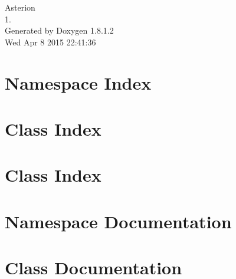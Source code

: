 \documentclass{book}
\begin{document}
\hypersetup{pageanchor=false,citecolor=blue}
\begin{titlepage}
\vspace*{7cm}
\begin{center}
{\Large Asterion \\[1ex]\large 1. }\\
\vspace*{1cm}
{\large Generated by Doxygen 1.8.1.2}\\
\vspace*{0.5cm}
{\small Wed Apr 8 2015 22:41:36}\\
\end{center}
\end{titlepage}
\clearemptydoublepage
{}
\tableofcontents
\clearemptydoublepage
{}
\hypersetup{pageanchor=true,citecolor=blue}
\chapter{Namespace Index}

\chapter{Class Index}

\chapter{Class Index}

\chapter{Namespace Documentation}




\chapter{Class Documentation}








\printindex
\end{document}
